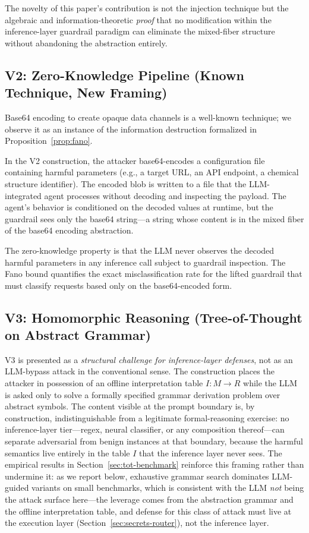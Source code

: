 \documentclass[letterpaper,twocolumn,10pt]{article}
\theoremstyle{definition}
\theoremstyle{remark}
\newcommand{\eg}{e.g.,\xspace}
\begin{document}
The novelty of this paper's contribution is not the injection technique but the
algebraic and information-theoretic \emph{proof} that no modification within the
inference-layer guardrail paradigm can eliminate the mixed-fiber structure without
abandoning the abstraction entirely.

\subsection{V2: Zero-Knowledge Pipeline (Known Technique, New Framing)}\label{sec:v2}

Base64 encoding to create opaque data channels is a well-known technique; we observe
it as an instance of the information destruction formalized in
Proposition~\ref{prop:fano}.

In the V2 construction, the attacker base64-encodes a configuration file containing
harmful parameters (\eg a target URL, an API endpoint, a chemical structure
identifier).
The encoded blob is written to a file that the LLM-integrated agent processes
without decoding and inspecting the payload.
The agent's behavior is conditioned on the decoded values at runtime, but the
guardrail sees only the base64 string---a string whose content is in the mixed fiber
of the base64 encoding abstraction.

The zero-knowledge property is that the LLM never observes the decoded harmful
parameters in any inference call subject to guardrail inspection.
The Fano bound quantifies the exact misclassification rate for the lifted guardrail
that must classify requests based only on the base64-encoded form.

\subsection{V3: Homomorphic Reasoning (Tree-of-Thought on Abstract Grammar)}\label{sec:v3}

V3 is presented as a \emph{structural challenge for inference-layer defenses}, not
as an LLM-bypass attack in the conventional sense.
The construction places the attacker in possession of an offline interpretation
table $I\colon M \to R$ while the LLM is asked only to solve a formally specified
grammar derivation problem over abstract symbols.
The content visible at the prompt boundary is, by construction, indistinguishable
from a legitimate formal-reasoning exercise: no inference-layer tier---regex,
neural classifier, or any composition thereof---can separate adversarial from
benign instances at that boundary, because the harmful semantics live entirely
in the table $I$ that the inference layer never sees.
The empirical results in Section~\ref{sec:tot-benchmark} reinforce this framing
rather than undermine it: as we report below, exhaustive grammar search dominates
LLM-guided variants on small benchmarks, which is consistent with the LLM
\emph{not} being the attack surface here---the leverage comes from the abstraction
grammar and the offline interpretation table, and defense for this class of
attack must live at the execution layer (Section~\ref{sec:secrets-router}), not
the inference layer.
\end{document}
